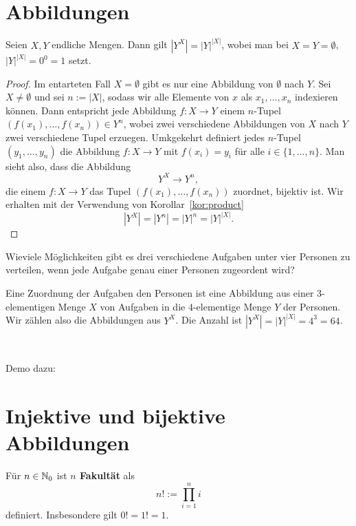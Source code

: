\section{Abbildungen} 

\begin{thm}
	Seien $X,Y $ endliche Mengen. Dann gilt $|Y^X| = |Y|^{|X|}$, wobei man bei $X= Y = \emptyset$, $|Y|^{|X|} = 0^0  =1$ setzt. 
\end{thm}
\begin{proof}
	Im entarteten Fall $X = \emptyset$ gibt es nur eine Abbildung von $\emptyset$ nach $Y$. 
	Sei $X \ne\emptyset$ und sei $n := |X|$, sodass wir alle Elemente von $x$ als $x_1,\ldots,x_n$ indexieren können. Dann entspricht jede Abbildung $f : X \to Y$ einem $n$-Tupel $(f(x_1),\ldots,f(x_n)) \in Y^n$, wobei zwei verschiedene Abbildungen von $X$ nach $Y$ zwei verschiedene Tupel erzuegen. 
	Umkgekehrt definiert jedes $n$-Tupel $(y_1,\ldots,y_n)$ die Abbildung $f: X \to Y$ mit $f(x_i)  = y_i$ für alle $i \in \{1,\ldots,n\}$. Man sieht also, dass die Abbildung 
	\[
			Y^X \to Y^n,
	\]
	die einem $f : X \to Y$ das Tupel $(f(x_1),\ldots,f(x_n))$ zuordnet, bijektiv ist. Wir erhalten mit der Verwendung von Korollar~\ref{kor:product}
	\[
			|Y^X| = |Y^n| = |Y|^n = |Y|^{|X|}. 
	\]
\end{proof} 

\begin{bsp}
	Wieviele Möglichkeiten gibt es drei verschiedene Aufgaben unter vier Personen zu verteilen, wenn jede Aufgabe genau einer Personen zugeordent wird? 
	
	Eine Zuordnung der Aufgaben den Personen ist eine Abbildung aus einer $3$-elementigen Menge $X$ von  Aufgaben in die $4$-elementige Menge $Y$ der Personen. Wir zählen also die Abbildungen aus $Y^X$. Die Anzahl ist $|Y^X| = |Y|^{|X|} = 4^3 = 64$. 
\end{bsp} 

\begin{bem}\
	 
	Demo dazu: 
	
\end{bem}

\section{Injektive und bijektive Abbildungen} 

\begin{defn}[Fakultät]
	Für $n \in \mathbb{N}_0$ ist \textbf{$n$ Fakultät} als 
	\[n ! := \prod_{i=1}^n i
	\] definiert. Insbesondere gilt $0!=1!=1$. 
\end{defn} 

